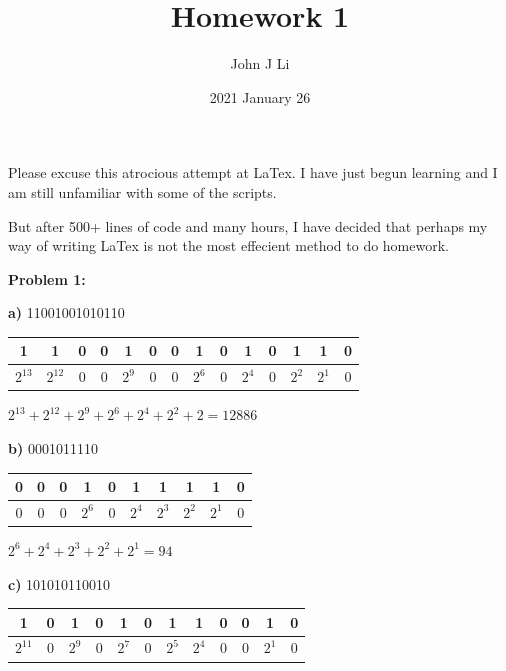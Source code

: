\documentclass{article}
\title{Homework 1}
\date{2021 January 26}
\author{John J Li}
\begin{document}
    \maketitle
    \noindent
    Please excuse this atrocious attempt at LaTex. I have just begun learning
    and I am still unfamiliar with some of the scripts.

    \noindent
    But after 500+ lines of code and many hours, I have decided that perhaps my way of writing LaTex is not the most effecient
    method to do homework.
    \newpage

    \textbf{Problem 1:}

    \quad \textbf{a)} 11001001010110

    \begin{center}
        \begin{tabular}{ c|c|c|c|c|c|c|c|c|c|c|c|c|c }
            1 & 1 & 0 & 0 & 1 & 0 & 0 & 1 & 0 & 1 & 0 & 1 & 1 & 0 \\
            \hline
            $2^{13}$ & $2^{12}$ & 0 & 0 & $2^9$ & 0 & 0 & $2^6$ & 0 & $2^4$ & 0 & $2^2$ & $2^1$ & 0
        \end{tabular}
    \end{center}

    \quad\quad $2^{13} + 2^{12} + 2^9 + 2^6 + 2^4 + 2^2 + 2 = \boxed{12886}$

    \quad \textbf{b)} 0001011110

    \begin{center}
        \begin{tabular}{ c|c|c|c|c|c|c|c|c|c }
            0 & 0 & 0 & 1 & 0 & 1 & 1 & 1 & 1 & 0 \\
            \hline
            0 & 0 & 0 & $2^6$ & 0 & $2^4$ & $2^3$ & $2^2$ & $2^1$ & 0
        \end{tabular}
    \end{center}

    \quad\quad $2^6 + 2^4 + 2^3 + 2^2 + 2^1 = \boxed{94}$

    \quad \textbf{c)} 101010110010

    \begin{center}
        \begin{tabular}{ c|c|c|c|c|c|c|c|c|c|c|c }
            1 & 0 & 1 & 0 & 1 & 0 & 1 & 1 & 0 & 0 & 1 & 0\\
            \hline
            $2^{11}$ & 0 & $2^9$ & 0 & $2^7$ & 0 & $2^5$ & $2^4$ & 0 & 0 & $2^1$ & 0
        \end{tabular}
    \end{center}
\end{document}
